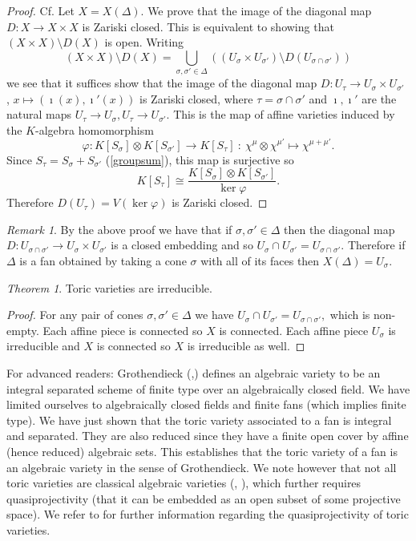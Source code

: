 \documentclass[BSc]{usydthesis}
\numberwithin{equation}{chapter}
\theoremstyle{remark}
\newtheorem{Theorem}[equation]{Theorem}
\newtheorem{Remark}[equation]{Remark}
\begin{document}
\begin{proof} Cf. \cite[Page.~ 21]{Fulton:Toric}
 Let $X=X(\Delta).$ We prove that the image of the diagonal map $D: X\to X \times X$ is Zariski closed. This is equivalent to showing that $ (X \times X)\setminus D(X)$ is open. Writing $$ (X \times X)\setminus D(X) = \bigcup_{\sigma, \sigma' \in \Delta} \left( (U_{\sigma} \times U_{\sigma'})\setminus D(U_{\sigma \cap \sigma'}) \right)$$ we see that it suffices show that the image of the diagonal map $D:U_{\tau} \to U_{\sigma} \times U_{\sigma'}$ , $x \mapsto (\imath(x), \imath'(x))$ is Zariski closed, where $\tau= \sigma \cap \sigma'$ and $ \imath, \imath'$ are the natural maps $U_{\tau} \to U_{\sigma}, U_{\tau} \to U_{\sigma'}.$ This is the map of affine varieties induced by the $K$-algebra homomorphism $$\varphi: K[S_{\sigma}] \otimes K[S_{\sigma'}] \to K[S_{\tau}] \ : \  \chi^{\mu} \otimes \chi^{\mu '} \mapsto \chi^{\mu + \mu'}.$$ Since $S_{\tau} = S_{\sigma} + S_{\sigma'} $ (\ref{groupsum}), this map is surjective so $$K[S_{\tau}] \cong \frac{K[S_{\sigma}] \otimes K[S_{\sigma'}]}{\ker \varphi}.$$ Therefore $D(U_{\tau}) = V(\ker \varphi)$ is Zariski closed. 
 
\end{proof}


\begin{Remark} 
 By the above proof we have that if $\sigma, \sigma'\in \Delta$ then the diagonal map $D: U_{\sigma \cap \sigma'} \to U_{\sigma} \times U_{\sigma'}$ is a closed embedding and so $U_{\sigma} \cap U_{\sigma'} = U_{\sigma \cap \sigma'}.$ Therefore if $\Delta$ is a fan obtained by taking a cone $\sigma$ with all of its faces then $X(\Delta) = U_{\sigma}.$ 
\end{Remark}

\begin{Theorem}
 Toric varieties are irreducible. 
\end{Theorem}
\begin{proof}
For any pair of cones $\sigma, \sigma'\in \Delta$ we have $U_{\sigma}\cap U_{\sigma'} = U_{\sigma \cap \sigma'},$ which is non-empty. Each affine piece is connected so $X$ is connected. Each affine piece $U_{\sigma}$ is irreducible and $X$ is connected so $X$ is irreducible as well. 
\end{proof}

For advanced readers: Grothendieck (\cite[Page ~ 105]{Hartshorne},\cite{EGA}) defines an algebraic variety to be an integral separated scheme of finite type over an algebraically closed field. We have limited ourselves to algebraically closed fields and finite fans (which implies finite type). We have just shown that the toric variety associated to a fan is integral and separated. They are also reduced since they have a finite open cover by affine (hence reduced) algebraic sets. This establishes that the toric variety of a fan is an algebraic variety in the sense of Grothendieck. We note however that not all toric varieties are classical algebraic varieties (\cite[Chap.~1, \S 4.1]{Shafarevich1}, \cite[\S 6.2]{Fulton:Curves}), which further requires quasiprojectivity (that it can be embedded as an open subset of some projective space). We refer to \cite[Chap.~7]{Cox} for further information regarding the quasiprojectivity of toric varieties.  
\end{document}
